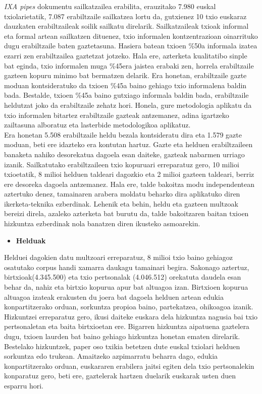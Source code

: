 \documentclass[information,article,submit,moreauthors,pdftex,10pt,a4paper]{Definitions/mdpi}
\begin{document}
\indent \textit{IXA pipes} dokumentu sailkatzailea erabilita, erauzitako 7.980 euskal txiolarietatik, 7.087 erabiltzaile sailkatzea lortu da, gutxienez 10 txio euskaraz dauzkaten erabiltzaileak soilik sailkatu direlarik. Sailkatzaileak txioak informal eta formal artean sailkatzen dituenez, txio informalen kontzentrazioan oinarrituko dugu erabiltzaile baten gaztetasuna. Hasiera batean txioen \%50a informala izatea ezarri zen erabiltzailea gaztetzat jotzeko. Hala ere, azterketa kualitatibo sinple bat eginda,  txio informalen muga \%45era jaistea erabaki zen, horrela erabiltzaile gazteen kopuru minimo bat bermatzen delarik. Era honetan, erabiltzaile gazte moduan kontsideratuko da txioen \%45a baino gehiago txio informalena baldin bada. Bestalde, txioen \%45a baino gutxiago informala baldin bada, erabiltzaile heldutzat joko da erabiltzaile zehatz hori. Honela, gure metodologia aplikatu da txio informalen bitartez erabiltzaile gazteak antzemanez, adina igartzeko zailtasuna alboratuz eta lasterbide metodologikoa aplikatuz.\\
\indent Era honetan 5.508 erabiltzaile heldu bezala kontsideratu dira eta 1.579 gazte moduan, beti ere idazteko era kontutan hartuz. Gazte eta helduen erabiltzaileen banaketa nahiko desorekatua dagoela esan daiteke, gazteak nabarmen urriago izanik. Sailkatutako erabiltzaileen txio kopuruari erreparatuz gero, 10 milioi txioetatik, 8 milioi helduen taldeari dagozkio eta 2 milioi gazteen taldeari, berriz ere desoreka dagoela antzemanez. Hala ere, talde bakoitza modu independentean aztertuko denez, tamainaren arabera moldatu beharko dira aplikatuko diren ikerketa-teknika ezberdinak. Lehenik eta behin, heldu eta gazteen multzoak bereizi direla, azaleko azterketa bat burutu da, talde bakoitzaren baitan txioen hizkuntza ezberdinak nola banatzen diren ikusteko asmoarekin.\\


\begin{itemize}
\item \textbf{Helduak} 
\end{itemize}

\indent  Helduei dagokien datu multzoari erreparatuz, 8 milioi txio baino gehiagoz osatutako corpus handi xamarra  daukagu tamainari begira. Sakonago aztertuz, birtxioak(4.345.500) eta txio pertsonalak (4.046.512) orekatuta daudela esan behar da, nahiz eta birtxio kopurua apur bat altuagoa izan. Birtxioen kopurua altuagoa izateak erakusten du joera bat dagoela helduen artean edukia konpartitzerako orduan, sorkuntza propioa baino, partekatzea, ohikoagoa izanik. Hizkuntzei erreparatuz gero, ikusi daiteke euskara dela hizkuntza nagusia bai txio pertsonaletan eta baita birtxioetan ere. Bigarren hizkuntza aipatuena gaztelera dugu, txioen laurden bat baino gehiago hizkuntza honetan ematen direlarik. Bestelako hizkuntzek, paper oso txikia betetzen dute euskal txiolari helduen sorkuntza edo trukean. Amaitzeko azpimarratu beharra dago, edukia konpartitzerako orduan, euskararen erabilera jaitsi egiten dela txio pertsonalekin konparatuz gero, beti ere, gaztelerak hartzen duelarik euskarak usten duen esparru hori.
\end{document}
